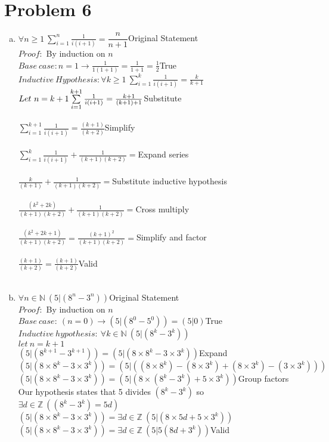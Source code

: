\documentclass[11pt,letterpaper]{article}
\begin{document}
\clearpage
\section*{Problem 6}
\begin{enumerate}[(a)]
\item
$\forall n\geq 1~\sum\limits_{i=1}^n\frac{1}{i(i+1)} = \dfrac{n}{n+1}$\hfill Original Statement\\
$Proof:$ By induction on $n$\\
$Base~case:n=1\rightarrow\frac{1}{1(1+1)}=\frac{1}{1+1} = \frac{1}{2}$\hfill True\\
$Inductive~ Hypothesis: \forall k\geq 1~\sum\limits_{i=1}^k\frac{1}{i(i+1)} = \frac{k}{k+1}$\\
$Let~ n=k+1\\
\\
\sum\limits_{i=1}^{k+1}\frac{1}{i(i+1)} = \frac{k+1}{(k+1)+1}$\hfill Substitute\\
\\
$\sum\limits_{i=1}^{k+1}\frac{1}{i(i+1)} = \frac{(k+1)}{(k+2)}$\hfill Simplify\\
\\
$\sum\limits_{i=1}^{k}\frac{1}{i(i+1)} + \frac{1}{(k+1)(k+2)}= $\hfill Expand series\\
\\
$\frac{k}{(k+1)} + \frac{1}{(k+1)(k+2)}= $\hfill Substitute inductive hypothesis\\
\\
$\frac{(k^2+2k)}{(k+1)(k+2)} + \frac{1}{(k+1)(k+2)}= $\hfill Cross multiply\\
\\
$\frac{(k^2+2k + 1)}{(k+1)(k+2)} = \frac{(k+1)^2}{(k+1)(k+2)}=$\hfill Simplify and factor\\
\\
$\frac{(k+1)}{(k+2)} =\frac{(k+1)}{(k+2)}$\hfill Valid\\
\\
\item
$\forall n\in\mathbb{N}~(5|(8^n - 3^n))$\hfill Original Statement\\
$Proof:$ By induction on $n$\\
$Base~case:~(n=0)\rightarrow(5|(8^0-5^0))= (5|0)$\hfill True\\
$Inductive~hypothesis:~\forall k\in\mathbb{N}~(5|(8^k - 3^k))$\\
$let ~n =k+1$\\
$(5|(8^{k+1} - 3^{k+1}))= (5|(8\times 8^{k} - 3\times 3^{k}))$\hfill Expand\\
$(5|(8\times 8^{k} - 3\times 3^{k}))= (5|((8\times 8^{k}) - (8\times 3^{k}) +(8\times 3^{k})- (3\times 3^{k})))$\\
$(5|(8\times 8^{k} - 3\times 3^{k}))= (5|(8\times (8^k -3^{k}) +5\times 3^{k}))$\hfill Group factors\\
Our hypothesis states that 5 divides $(8^k - 3^k)$ so $\exists d\in\mathbb{Z}~((8^k-3^k)=5d)$\\
$(5|(8\times 8^{k} - 3\times 3^{k}))= \exists d\in\mathbb{Z}~(5|(8\times 5d +5\times 3^{k}))$\\
$(5|(8\times 8^{k} - 3\times 3^{k}))= \exists d\in\mathbb{Z}~(5|5(8d + 3^{k}))$\hfill Valid\\


\end{enumerate}
\end{document}
